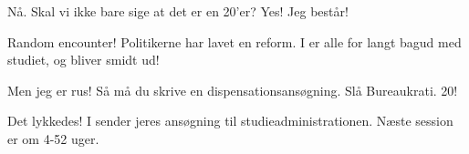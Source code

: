 \documentclass[a4paper,11pt]{article}
\begin{document}
\begin{sketch}

 Nå. Skal vi ikke bare sige at det er en 20'er?
 Yes!  Jeg består!

 Random encounter!   Politikerne har
lavet en reform. I er alle for langt bagud med studiet, og bliver
smidt ud!

 Men jeg er rus!
 Så må du skrive en dispensationsansøgning. Slå Bureaukrati.
 20!

 Det lykkedes! I sender jeres ansøgning til
studieadministrationen.   Næste session
er om 4-52 uger.

\end{sketch}
\end{document}

